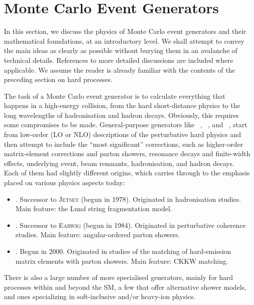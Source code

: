 \section{Monte Carlo Event Generators \label{sec:MC}}

In this section, we discuss the physics of Monte Carlo event generators and
their mathematical foundations, at an introductory level. We shall attempt
to convey the main ideas as clearly as possible without burying them
in an avalanche of technical details. References to
more detailed discussions are included where applicable.
We assume the reader is already familiar with the contents of the
preceding section on hard processes. 

The task of a Monte Carlo event generator is to calculate
everything that happens in a high-energy collision, from the hard
short-distance physics to the long wavelengths of hadronisation and
hadron decays. Obviously, this requires some compromises to be
made. General-purpose generators like \Hw~\cite{Corcella:2000bw,Bahr:2008pv,Bellm:2015jjp},
\Py~\cite{Sjostrand:2006za,Sjostrand:2014zea}, and \Sh~\cite{Gleisberg:2008ta}, 
start from low-order (LO or NLO) descriptions of the perturbative hard physics
and then attempt to include the ``most significant'' corrections, such
as higher-order matrix-element corrections and parton showers,
resonance decays and finite-width effects, 
underlying event, beam remnants, hadronisation, and hadron
decays. Each of them had slightly different origins, which carries
through to the emphasis placed on various physics aspects today:
\begin{itemize}
\item \Py.  
Successor to \textsc{Jetset} (begun in 1978). Originated in
hadronisation studies. Main feature: the Lund string fragmentation model. 
\item \Hw. 
Successor to \textsc{Earwig} (begun in 1984). Originated in
perturbative coherence studies. Main feature:
angular-ordered parton showers.
\item \Sh. 
Begun in 2000. Originated in studies of the matching of 
hard-emission matrix elements with parton showers. Main feature: 
CKKW matching. 
\end{itemize}
There is also a large number of more specialised generators, mainly
for hard processes within and beyond the SM, 
a few that offer alternative shower
models, and ones specializing in soft-inclusive and/or heavy-ion
physics.

